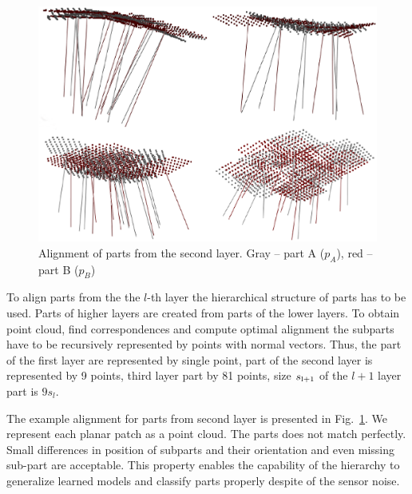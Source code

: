 \documentclass[letterpaper,10pt,conference]{ieeeconf}  %
\begin{document}
\begin{figure}[t]
 \centering
 \includegraphics[width=0.95\columnwidth]{../images/parts2ndLayer.eps}
 \caption{Alignment of parts from the second layer. Gray -- part A ($p_A$), red -- part B ($p_B$)}
 \label{parts2ndLayer}
\end{figure}

To align parts from the the $l$-th layer the hierarchical structure of parts has to be used. Parts of higher layers are created from parts of the lower layers. To obtain point cloud, find correspondences and compute optimal alignment the subparts have to be recursively represented by points with normal vectors. Thus, the part of the first layer are represented by single point, part of the second layer is represented by 9 points, third layer part by 81 points, size $s_{\rm l+1}$ of the $l+1$ layer part is $9s_l$. 

The example alignment for parts from second layer is presented in Fig.~\ref{parts2ndLayer}. We represent each planar patch as a point cloud. The parts does not match perfectly. Small differences in position of subparts and their orientation and even missing sub-part are acceptable. This property enables the capability of the hierarchy to generalize learned models and classify parts properly despite of the sensor noise. 
\end{document}
